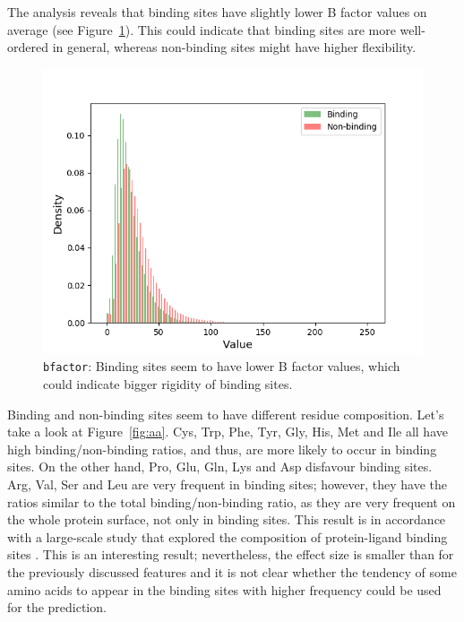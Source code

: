 The analysis reveals that binding sites have slightly lower B factor values on average (see Figure~\ref{fig:bfactor}). This could indicate that binding sites are more well-ordered in general, whereas non-binding sites might have higher flexibility.

\begin{figure}[]
\centering
\includegraphics[width=0.7\linewidth]{../img/bfactor_hist.png}
\caption[Feature \texttt{bfactor}]{\texttt{bfactor}: Binding sites seem to have lower B factor values, which could indicate bigger rigidity of binding sites.}
\label{fig:bfactor}
\end{figure}

Binding and non-binding sites seem to have different residue composition. Let's take a look at Figure~\ref{fig:aa}. Cys, Trp, Phe, Tyr, Gly, His, Met and Ile all have high binding/non-binding ratios, and thus, are more likely to occur in binding sites. On the other hand, Pro, Glu, Gln, Lys and Asp disfavour binding sites. Arg, Val, Ser and Leu are very frequent in binding sites; however, they have the ratios similar to the total binding/non-binding ratio, as they are very frequent on the whole protein surface, not only in binding sites. This result is in accordance with a large-scale study that explored the composition of protein-ligand binding sites \cite{lbscomposition}. This is an interesting result; nevertheless, the effect size is smaller than for the previously discussed features and it is not clear whether the tendency of some amino acids to appear in the binding sites with higher frequency could be used for the prediction.

